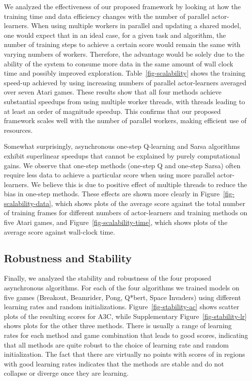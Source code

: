 \documentclass{article} \usepackage{times}
\begin{document}
We analyzed the effectiveness of our proposed framework by looking at how the training time and data efficiency changes with the number of parallel actor-learners.
When using multiple workers in parallel and updating a shared model, one would expect that in an ideal case, for a given task and algorithm, the number of training steps to achieve a certain score would remain the same with varying numbers of workers.
Therefore, the advantage would be solely due to the ability of the system to consume more data in the same amount of wall clock time and possibly improved exploration.
Table~\ref{fig-scalability} shows the training speed-up achieved by using increasing numbers of parallel actor-learners averaged over seven Atari games.
These results show that all four methods achieve substantial speedups from using multiple worker threads, with  threads leading to at least an order of magnitude speedup.
This confirms that our proposed framework scales well with the number of parallel workers, making efficient use of resources.






Somewhat surprisingly, asynchronous one-step Q-learning and Sarsa algorithms exhibit superlinear speedups that cannot be explained by purely computational gains.
We observe that one-step methods (one-step Q and one-step Sarsa) often require less data to achieve a particular score when using more parallel actor-learners.
We believe this is due to positive effect of multiple threads to reduce the bias in one-step methods.
These effects are shown more clearly in Figure~\ref{fig-scalability-data}, which shows plots of the average score against the total number of training frames for different numbers of actor-learners and training methods on five Atari games, and Figure~\ref{fig-scalability-time}, which shows plots of the average score against wall-clock time.


\subsection{Robustness and Stability}
Finally, we analyzed the stability and robustness of the four proposed asynchronous algorithms.
For each of the four algorithms we trained models on five games (Breakout, Beamrider, Pong, Q*bert, Space Invaders) using  different learning rates and random initializations.
Figure~\ref{fig-stability-ac} shows scatter plots of the resulting scores for A3C, while Supplementary Figure~\ref{fig-stability-lr} shows plots for the other three methods.
There is usually a range of learning rates for each method and game combination that leads to good scores, indicating that all methods are quite robust to the choice of learning rate and random initialization.
The fact that there are virtually no points with scores of  in regions with good learning rates indicates that the methods are stable and do not collapse or diverge once they are learning.
\end{document}
